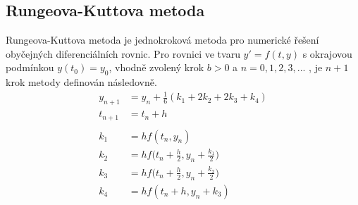 \documentclass[reqno, a4paper]{amsart}
\begin{document}
				\subsection{Rungeova-Kuttova metoda}
				\label{sec:Rungeova-Kuttova metoda}
				Rungeova-Kuttova metoda je jednokroková metoda pro numerické řešení obyčejných diferenciálních rovnic. Pro rovnici ve tvaru \( y'= f(t,y)\) s okrajovou podmínkou \(y(t_0)=y_0 \), vhodně zvolený krok \(b>0\) a \(n = 0, 1, 2, 3, ...\) , je $n+1$ krok metody definován následovně.
				\begin{align*}
					y_{n+1} &= y_n + \frac{1}{6} (k_1 + 2k_2 +2k_3 +k_4) \\
					t_{n+1} &= t_n +h \\ \\
					k_1 &= h f(t_n,y_n) \\
					k_2 &= h f\Big(t_n + \frac{h}{2},y_n + \frac{k_1}{2}\Big) \\
					k_3 &= h f\Big(t_n + \frac{h}{2},y_n + \frac{k_2}{2}\Big) \\
					k_4 &= h f(t_n + h ,y_n + k_3) 
				\end{align*}
\end{document}
